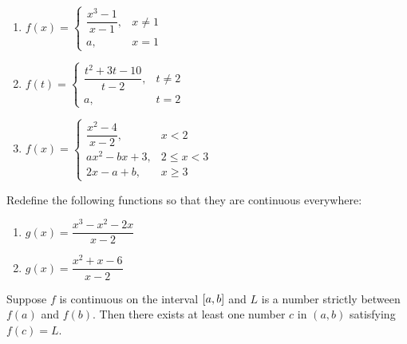 \documentclass[mathNotesPreamble]{subfiles}
\begin{document}
    \begin{enumerate}[itemsep=\stretch{1}]
      \item 
        $f(x)=\begin{cases}
          \dfrac{x^3-1}{x-1},& x\neq 1\\
          a,& x=1
        \end{cases}$
      \item 
        $f(t)=\begin{cases}
          \dfrac{t^2+3t-10}{t-2},& t\neq2\\
          a,& t=2
        \end{cases}$
    \pagebreak

      \item 
        $f(x)=\begin{cases}
          \dfrac{x^2-4}{x-2},& x<2\\
          ax^2-bx+3,& 2\leq x<3\\
          2x-a+b,& x\geq 3
        \end{cases}$
    \end{enumerate}
  \begin{ex*}
    Redefine the following functions so that they are continuous everywhere:
    \begin{enumerate}[itemsep=\stretch{1}]
      \item $g(x)=\dfrac{x^3-x^2-2x}{x-2}$
      \item $g(x)=\dfrac{x^2+x-6}{x-2}$
    \end{enumerate}
  \end{ex*}
  \pagebreak
  
  \begin{thmBox*}
    Suppose $f$ is continuous on the interval ${\left[a,b\right]}$ and $L$ is a number strictly between $f(a)$ and $f(b)$. Then there exists at least one number $c$ in $(a,b)$ satisfying $f(c)=L$.
  \end{thmBox*}
  
\end{document}
